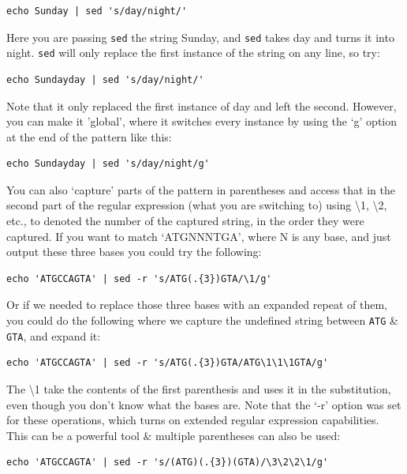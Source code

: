 \documentclass[a4paper,12pt,twoside]{memoir}
\begin{document}
\begin{lstlisting}
echo Sunday | sed 's/day/night/' 
\end{lstlisting}

Here you are passing \texttt{sed} the string Sunday, and \texttt{sed} takes day and turns it into night.  
\texttt{sed} will only replace the first instance of the string on any line, so try: \\

\begin{lstlisting}
echo Sundayday | sed 's/day/night/' 
\end{lstlisting}

Note that it only replaced the first instance of day and left the second.  
However, you can make it 'global', where it switches every instance by using the `g' option at the end of the pattern like this: \\

\begin{lstlisting}
echo Sundayday | sed 's/day/night/g' 
\end{lstlisting}

You can also `capture' parts of the pattern in parentheses and access that in the second part of the regular expression (what you are switching to) using \textbackslash 1, \textbackslash 2, etc., to denoted the number of the captured string, in the order they were captured.
If you want to match `ATGNNNTGA', where N is any base, and just output these three bases you could try the following:\\
\begin{lstlisting}
echo 'ATGCCAGTA' | sed -r 's/ATG(.{3})GTA/\1/g'
\end{lstlisting}

Or if we needed to replace those three bases with an expanded repeat of them, you could do the following where we capture the undefined string between \texttt{ATG} \& \texttt{GTA}, and expand it: \\
\begin{lstlisting}
echo 'ATGCCAGTA' | sed -r 's/ATG(.{3})GTA/ATG\1\1\1GTA/g'
\end{lstlisting}

The \textbackslash 1 take the contents of the first parenthesis and uses it in the substitution, even though you don't know what the bases are.
Note that the `-r' option was set for these operations, which turns on extended regular expression capabilities.
This can be a powerful tool \& multiple parentheses can also be used: \\
\begin{lstlisting}
echo 'ATGCCAGTA' | sed -r 's/(ATG)(.{3})(GTA)/\3\2\2\1/g'
\end{lstlisting}
\end{document}
